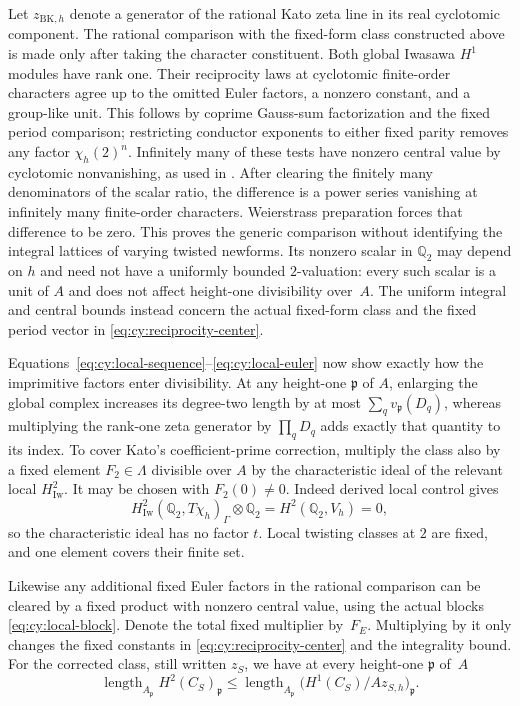 Let $z_{\mathrm{BK},h}$ denote a generator of the rational Kato zeta
line in its real cyclotomic component.  The rational comparison with
the fixed-form class constructed above is made only after taking the
character constituent.  Both global Iwasawa $H^1$ modules have rank one.
Their reciprocity laws at cyclotomic finite-order characters agree up to
the omitted Euler factors, a nonzero constant, and a group-like unit.
This follows by coprime Gauss-sum factorization and the fixed period
comparison; restricting conductor exponents to either fixed parity
removes any factor $\chi_h(2)^n$.  Infinitely many of these tests have
nonzero central value by cyclotomic nonvanishing, as used in
\cite[Theorem~13.5(2)]{Kato2004}.  After clearing the finitely many
denominators of the scalar ratio, the difference is a power series
vanishing at infinitely many finite-order characters.  Weierstrass
preparation forces that difference to be zero.  This proves the generic
comparison without identifying the integral lattices of varying
twisted newforms.  Its nonzero scalar in $\mathbb Q _2$ may depend on
$h$ and need not have a uniformly bounded $2$-valuation: every such
scalar is a unit of $A$ and does not affect height-one divisibility
over~$A$.  The uniform integral and central bounds instead concern
the actual fixed-form class and the fixed period vector in
\eqref{eq:cy:reciprocity-center}.

Equations~\eqref{eq:cy:local-sequence}--\eqref{eq:cy:local-euler} now show exactly
how the imprimitive factors enter divisibility.  At any height-one
$\mathfrak p$ of $A$, enlarging the global complex increases its
degree-two length by at most $\sum_qv_{\mathfrak p}(D_q)$, whereas
multiplying the rank-one zeta generator by $\prod_qD_q$ adds exactly
that quantity to its index.  To cover Kato's coefficient-prime correction, multiply the
class also by a fixed element $F_2\in\Lambda$ divisible over $A$ by the
characteristic ideal of the relevant local $H^2_{\mathrm{Iw}}$.
It may be chosen with $F_2(0)\ne0$.  Indeed derived local control gives
\[
 H^2_{\mathrm{Iw}}(\mathbb Q _2,T\chi_h)_\Gamma\otimes\mathbb Q _2
       =H^2(\mathbb Q _2,V_h)=0,
\]
so the characteristic ideal has no factor $t$.  Local twisting classes
at $2$ are fixed, and one element covers their finite set.

Likewise any additional fixed Euler factors in the rational comparison
can be cleared by a fixed product with nonzero central value, using the
actual blocks \eqref{eq:cy:local-block}.  Denote the total fixed multiplier
by~$F_E$.  Multiplying by it only changes the fixed constants in
\eqref{eq:cy:reciprocity-center} and the integrality bound.  For the corrected
class, still written $z_S$, we have at every height-one $\mathfrak p$ of~$A$
\begin{equation}\label{eq:cy:divisibility}
 \operatorname{length}_{A_{\mathfrak p}}H^2(C_S)_{\mathfrak p}
 \leq
 \operatorname{length}_{A_{\mathfrak p}}
       \bigl(H^1(C_S)/Az_{S,h}\bigr)_{\mathfrak p}.
\end{equation}

